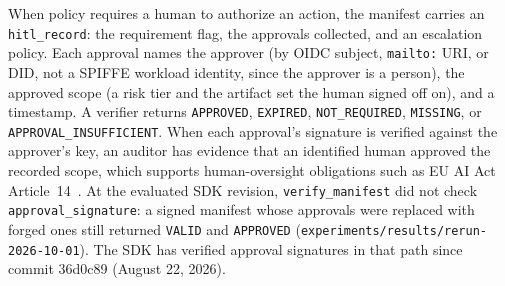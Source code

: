 When policy requires a human to authorize an action, the manifest carries an
\texttt{hitl\_record}: the requirement flag, the approvals collected, and an
escalation policy. Each approval names the approver (by OIDC subject,
\texttt{mailto:} URI, or DID, not a SPIFFE workload identity, since the approver is
a person), the approved scope (a risk tier and the artifact set the human signed off
on), and a timestamp. A verifier returns \texttt{APPROVED}, \texttt{EXPIRED},
\texttt{NOT\_REQUIRED}, \texttt{MISSING}, or \texttt{APPROVAL\_INSUFFICIENT}. When
each approval's signature is verified against the approver's key, an auditor has
evidence that an identified human approved the recorded scope, which supports
human-oversight obligations such as EU AI Act Article~14~\citep{euaiact2024}. At the
evaluated SDK revision, \texttt{verify\_manifest} did not check
\texttt{approval\_signature}: a signed manifest whose approvals were replaced with
forged ones still returned \texttt{VALID} and \texttt{APPROVED}
(\texttt{experiments/results/rerun-2026-10-01}). The SDK has verified approval
signatures in that path since commit 36d0c89 (August 22, 2026).

